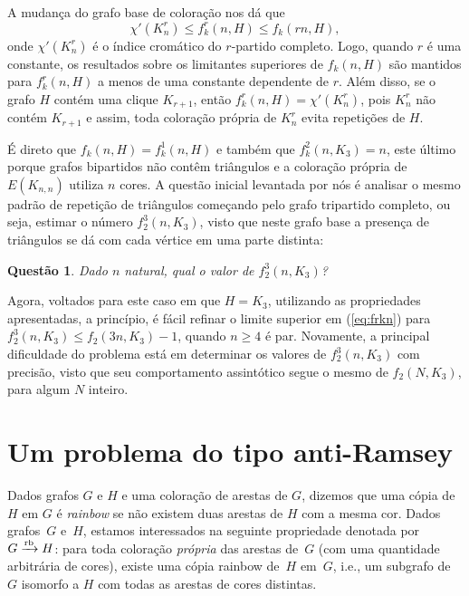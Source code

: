 \documentclass[12pt,a4paper]{book}
\def\rbarrow{\xrightarrow[]{\raisebox{0.0mm}[0mm]{$\scriptstyle \rm rb$}}}
\newtheorem{questao}[teorema] {Questão}
\begin{document}
A mudança do grafo base de coloração nos dá que 
%
    \begin{equation}\label{eq:frkn}
        \chi'(K^r_n) \leq f_k^r(n, H) \leq f_k(rn, H),
    \end{equation}
%
onde $\chi'(K^r_n)$ é o índice cromático do $r$-partido completo. 
Logo, quando $r$ é uma constante, os resultados sobre os limitantes superiores de $f_k(n,H)$ são mantidos para $f_k^r(n,H)$ a menos de uma constante dependente de $r$.
Além disso, se o grafo $H$ contém uma clique $K_{r+1}$, então ${f_k^r(n, H) = \chi'(K^r_n)}$, pois $K^r_n$ não contém $K_{r+1}$ e assim, toda coloração própria de $K_n^r$ evita repetições de $H$.

É direto que $f_k(n,H) = f_k^1(n,H)$ e também que $f_k^2(n, K_3)= n$, este último porque grafos bipartidos não contêm triângulos e a coloração própria de $E(K_{n,n})$ utiliza $n$ cores. 
A questão inicial levantada por nós é analisar o mesmo padrão de repetição de triângulos começando pelo grafo tripartido completo, ou seja, estimar o número $f_2^3(n, K_3)$, visto que neste grafo base a presença de triângulos se dá com cada vértice em uma parte distinta:

\begin{questao}\label{q:tripartido}
    Dado $n$ natural, qual o valor de $f_2^3(n, K_3)$?
\end{questao}

Agora, voltados para este caso em que $H=K_3$, utilizando as propriedades apresentadas,
a princípio, é fácil refinar o limite superior em (\ref{eq:frkn}) para $f_2^3(n,K_3) \leq f_2(3n, K_3)-1$, quando $n \geq 4$ é par.
Novamente, a principal dificuldade do problema está em determinar os valores de $f_2^3(n, K_3)$ com precisão, visto que seu comportamento assintótico segue o mesmo de $f_2(N, K_3)$, para algum $N$ inteiro.


 

\chapter{Um problema do tipo anti-Ramsey}\label{cap:anti}

Dados grafos $G$ e $H$ e uma coloração de arestas de $G$, dizemos que uma cópia de $H$ em $G$ é \emph{rainbow} se não existem duas arestas de $H$ com a mesma cor.
%
Dados grafos~$G$ e~$H$, estamos interessados na seguinte propriedade denotada por ${G\rbarrow H}$: para toda coloração \textit{própria} das arestas de~$G$ (com uma quantidade arbitrária de cores),
existe uma cópia rainbow de~$H$ em~$G$, i.e., um subgrafo de $G$ isomorfo a $H$ com todas as arestas de cores distintas.
\end{document}
